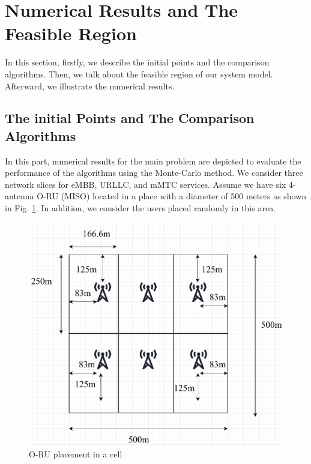 \documentclass[lettersize,journal]{IEEEtran}
\begin{document}
\section{Numerical Results and The Feasible Region}\label{NE}
In this section, firstly, we describe the initial points and the comparison algorithms.
Then, we talk about the feasible region of our system model. Afterward, we illustrate the numerical results.
\subsection{The initial Points and The Comparison Algorithms}
In this part, numerical results for the main problem are depicted to evaluate the performance of the algorithms using the Monte-Carlo method. We consider three network slices for eMBB, URLLC, and mMTC services.
Assume we have six 4-antenna O-RU (MISO) located in a place with a diameter of 500 meters as shown in Fig. \ref{fig:cell}. In addition, we consider the users placed randomly in this area.

\begin{figure}
  \centering
    \includegraphics[scale = 0.30]{cell.pdf}
  \caption{O-RU placement in a cell}
  \label{fig:cell}
\end{figure}
\end{document}
